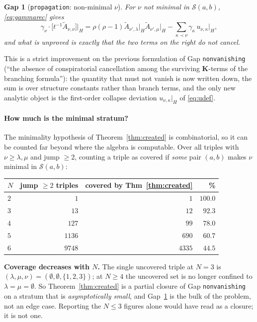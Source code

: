 \documentclass[11pt]{article}
\theoremstyle{plain}
\theoremstyle{definition}
\theoremstyle{remark}
\theoremstyle{plain}
\newtheorem{gapthm}{Gap}
\newcommand{\bK}{\mathbf{K}}
\newcommand{\At}{\widetilde{A}}
\begin{document}
\begin{gapthm}[\texttt{propagation}: non-minimal $\nu$]\label{gap:prop}
For $\nu$ not minimal in $\mathcal{S}(a,b)$, \eqref{eq:gammarec} gives
\[
\gamma_{\nu}\cdot\bigl[t^{-1}\At_{\nu,\nu}\bigr]\big|_H
=\rho(\rho-1)\At_{\nu',\lambda}\big|_H\At_{\nu',\mu}\big|_H
-\sum_{\kappa\prec\nu}\gamma_{\kappa}\,u_{\nu,\kappa}\big|_H ,
\]
and what is unproved is exactly that the two terms on the right do not
cancel.
\end{gapthm}

This is a strict improvement on the previous formulation of Gap
\texttt{nonvanishing} (``the absence of conspiratorial cancellation among the
surviving $\bK$-terms of the branching formula''): the quantity that must not
vanish is now written down, the sum is over structure constants rather than
branch terms, and the only new analytic object is the first-order collapse
deviation $u_{\nu,\kappa}|_H$ of \eqref{eq:udef}.

\paragraph{How much is the minimal stratum?}
The minimality hypothesis of Theorem~\ref{thm:created} is combinatorial, so it
can be counted far beyond where the algebra is computable.  Over all triples
with $\nu\ge\lambda,\mu$ and jump $\ge2$, counting a triple as covered if
\emph{some} pair $(a,b)$ makes $\nu$ minimal in $\mathcal{S}(a,b)$:
\begin{center}
\begin{tabular}{@{}lrrr@{}}
\toprule
$N$ & jump $\ge2$ triples & covered by Thm~\ref{thm:created} & \% \\
\midrule
$2$ & $1$    & $1$    & $100.0$ \\
$3$ & $13$   & $12$   & $92.3$ \\
$4$ & $127$  & $99$   & $78.0$ \\
$5$ & $1136$ & $690$  & $60.7$ \\
$6$ & $9748$ & $4335$ & $44.5$ \\
\bottomrule
\end{tabular}
\end{center}
\textbf{Coverage decreases with $N$.}  The single uncovered triple at $N=3$ is
$(\lambda,\mu,\nu)=(\emptyset,\emptyset,\{1,2,3\})$; at $N\ge4$ the uncovered
set is no longer confined to $\lambda=\mu=\emptyset$.  So
Theorem~\ref{thm:created} is a partial closure of Gap \texttt{nonvanishing} on
a stratum that is \emph{asymptotically small}, and Gap~\ref{gap:prop} is the
bulk of the problem, not an edge case.  Reporting the $N\le3$ figures alone
would have read as a closure; it is not one.
\end{document}
